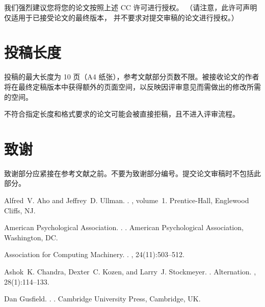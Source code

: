 \documentclass[11pt]{article}
\begin{document}
我们强烈建议您将您的论文按照上述 CC 许可进行授权。
（请注意，此许可声明仅适用于已接受论文的最终版本，
并不要求对提交审稿的论文进行授权。）
\section{投稿长度}
\label{sec:length}

投稿的最大长度为 10 页（A4 纸张），参考文献部分页数不限。被接收论文的作者将在最终定稿版本中获得额外的页面空间，以反映因评审意见而需做出的修改所需的空间。

不符合指定长度和格式要求的论文可能会被直接拒稿，且不进入评审流程。
\section*{致谢}

致谢部分应紧接在参考文献之前。不要为致谢部分编号。提交论文审稿时不包括此部分。

\begin{thebibliography}{}

Alfred~V. Aho and Jeffrey~D. Ullman.
.
, volume~1.
\newblock Prentice-{Hall}, Englewood Cliffs, NJ.

{American Psychological Association}.
.
.
\newblock American Psychological Association, Washington, DC.

{Association for Computing Machinery}.
.
, 24(11):503--512.

Ashok~K. Chandra, Dexter~C. Kozen, and Larry~J. Stockmeyer.
.
\newblock Alternation.
,
  28(1):114--133.

Dan Gusfield.
.
.
\newblock Cambridge University Press, Cambridge, UK.

\end{thebibliography}
\end{document}
